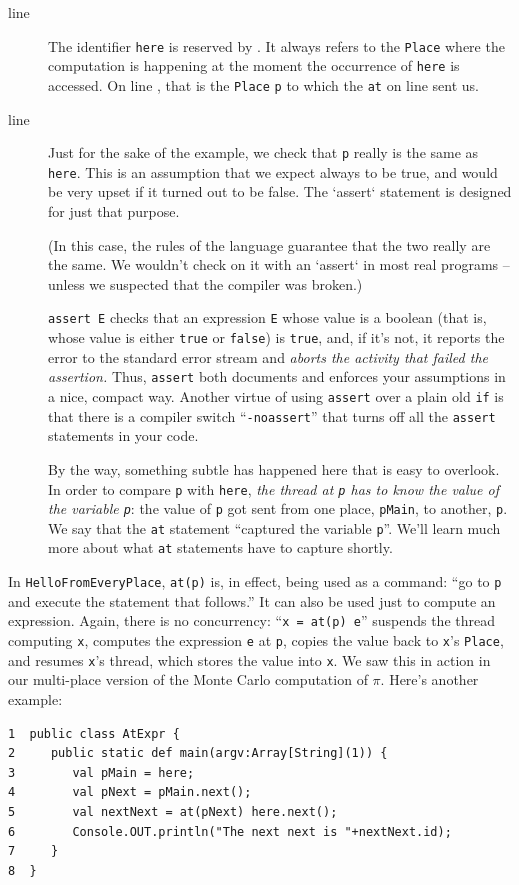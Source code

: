 \begin{description}
\item[line ] The identifier {\tt here} is reserved by \Xten.
It always refers to the {\tt Place} where the computation is happening at
the moment the occurrence of {\tt here} is accessed. On line ,
that is the
{\tt Place} {\tt p} to which the {\tt at} on line   sent us.  

\item[line ] Just for the sake of the example,
we check that {\tt p} really is the same as {\tt here}.  
This is an assumption that we expect always to be true, and would be very
upset if it turned out to be false.  The \xcd`assert` statement is designed
for just that purpose.  

(In this case, the rules of the language guarantee that the two really are the
same.  We wouldn't check on it with an \xcd`assert` in most real programs --
unless we suspected that the compiler was broken.)


   {\tt assert E} checks that an expression {\tt E} whose value is a 
   boolean (that is, whose value is either {\tt true} or {\tt false}) is {\tt true}, and, if it's not,
   it reports the error to the standard error stream and {\em aborts the activity
   that failed the assertion.}   Thus, {\tt assert} both documents and enforces
   your assumptions in a nice, compact way.
   Another virtue of using {\tt assert} over a plain
   old {\tt if} is that there is a compiler switch ``{\tt -noassert}'' that turns off all
   the {\tt assert} statements in your code.  


By the way, something subtle has happened here that is easy to overlook.
In order to compare {\tt p} with {\tt here}, {\em the thread at {\tt p} has to know
the value of the variable {\tt p}}: the value of {\tt p} got
sent from one place, {\tt pMain}, to another, {\tt p}.  We say that
the {\tt at} statement ``captured the variable {\tt p}''.  
We'll learn much more about what {\tt at} statements have to capture shortly.       
\end{description}

In {\tt HelloFromEveryPlace}, {\tt at(p)} is, in effect, being used as a command: 
``go to {\tt p} and execute the statement that follows.''   It can also be used just to 
compute an expression.  Again, there is no concurrency: ``{\tt x = at(p) e}'' suspends
the thread computing {\tt x}, computes the expression {\tt e} at {\tt p}, copies the
value back to {\tt x}'s {\tt Place}, and resumes {\tt x}'s thread, which
stores the value into {\tt x}.  We saw this in action in our multi-place version
of the Monte Carlo computation of $\pi$.  Here's another example:
\begin{verbatim}
1  public class AtExpr {
2     public static def main(argv:Array[String](1)) {
3        val pMain = here;                      
4        val pNext = pMain.next();              
5        val nextNext = at(pNext) here.next();  
6        Console.OUT.println("The next next is "+nextNext.id);     
7     }
8  }
\end{verbatim}

